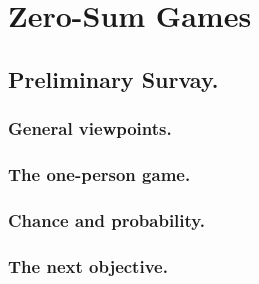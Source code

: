 \chapter{Zero-Sum Games}

\section{Preliminary Survay. \cite{vonNeumann1944}}

\subsection{General viewpoints. \cite{vonNeumann1944}}

\subsection{The one-person game. \cite{vonNeumann1944}}

\subsection{Chance and probability. \cite{vonNeumann1944}}

\subsection{The next objective. \cite{vonNeumann1944}}